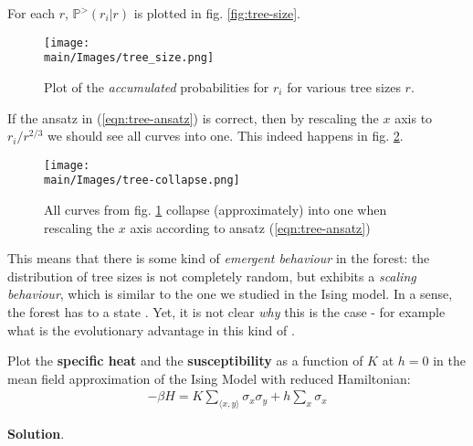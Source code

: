 \documentclass[../../main.tex]{subfiles}
\begin{document}
For each $r$, $\mathbb{P}^>(r_i|r)$ is plotted in fig. \ref{fig:tree-size}.

\begin{figure}[H]
    \centering
    \texttt{[image: \\main/Images/tree\_size.png]}
    \caption{Plot of the \textit{accumulated} probabilities for $r_i$ for various tree sizes $r$.}
    \label{fig:tree_size}
\end{figure}

If the ansatz in (\ref{eqn:tree-ansatz}) is correct, then by rescaling the $x$ axis to $r_i/r^{2/3}$ we should see all curves  into one. This indeed happens in fig. \ref{fig:tree-collapse}.

\begin{figure}[H]
    \centering
    \texttt{[image: \\main/Images/tree-collapse.png]}
    \caption{All curves from fig. \ref{fig:tree_size} collapse (approximately) into one when rescaling the $x$ axis according to ansatz (\ref{eqn:tree-ansatz})}
    \label{fig:tree-collapse}
\end{figure}

This means that there is some kind of \textit{emergent behaviour} in the forest: the distribution of tree sizes is not completely random, but exhibits a \textit{scaling behaviour}, which is similar to the one we studied in the Ising model. In a sense, the forest has  to a state . Yet, it is not clear \textit{why} this is the case - for example what is the evolutionary advantage in this kind of .

\begin{exo}[Plots]
    Plot the \textbf{specific heat} and the \textbf{susceptibility} as a function of $K$ at $h=0$ in the mean field approximation of the Ising Model with reduced Hamiltonian:
    \begin{align*}
        -\beta H = K \sum_{\langle x,y \rangle} \sigma_x \sigma_y + h \sum_x \sigma_x
    \end{align*}

    \medskip

    \textbf{Solution}. 
\end{exo}
\end{document}
